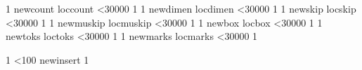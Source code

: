 \RequirePackage{luatexbase-regs}
\def\checkregister#1{%
  \edef\newregister{\expandafter\noexpand\csname new#1\endcsname}%
  \edef\locregister{\expandafter\noexpand\csname loc#1\endcsname}%
  \count0 1
  \loop
    \newregister\dummy
    \locregister\dummy
  \ifnum\count0<30000
    \advance{} 1
  \repeat}
\checkregister{count}
\checkregister{dimen}
\checkregister{skip}
\checkregister{muskip}
\checkregister{box}
\checkregister{toks}
\checkregister{marks}

 1
\loop \ifnum{}<100
  \csname newinsert\endcsname\dummy
  \advance{} 1
\repeat

\globcountblk {}
\globdimenblk {}
\globskipblk  {}
\globmuskipblk{}
\globboxblk   {}
\globtoksblk  {}
\globmarksblk {}

\loccountblk  {}
\locdimenblk  {}
\locskipblk   {}
\locmuskipblk {}
\locboxblk    {}
\loctoksblk   {}
\locmarksblk  {}
\stop
\endinput
